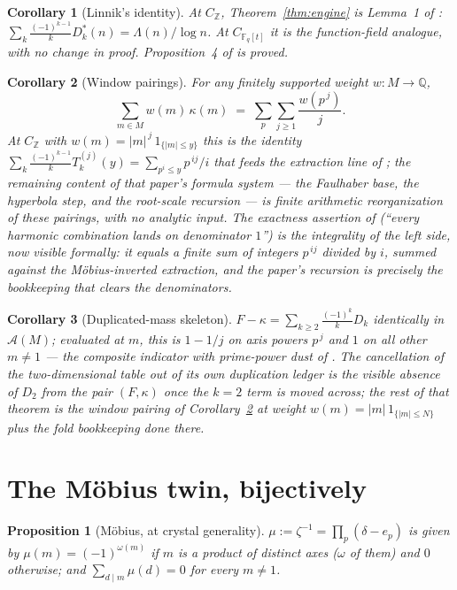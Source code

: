 \documentclass[11pt]{article}
\newtheorem{proposition}{Proposition}
\newtheorem{corollary}{Corollary}
\theoremstyle{remark}
\newcommand{\Q}{\mathbb{Q}}
\newcommand{\Z}{\mathbb{Z}}
\newcommand{\A}{\mathcal{A}}
\begin{document}
\begin{corollary}[Linnik's identity]\label{cor:linnik}
At $C_{\Z}$, Theorem~\ref{thm:engine} is Lemma~1 of \cite{CompanionI}:
$\sum_k \frac{(-1)^{k-1}}{k} D^*_k(n) = \Lambda(n)/\log n$. At $C_{\mathbb{F}_q[t]}$ it is the
function-field analogue, with no change in proof. Proposition~4 of \cite{Defs} is proved.
\end{corollary}

\begin{corollary}[Window pairings]\label{cor:pairing}
For any finitely supported weight $w \colon M \to \Q$,
\[
\sum_{m \in M} w(m)\, \kappa(m) \;=\; \sum_{p} \sum_{j \ge 1} \frac{w(p^{\,j})}{j}.
\]
At $C_\Z$ with $w(m) = |m|^{\,j}\,1_{\{|m| \le y\}}$ this is the identity
$\sum_{k} \frac{(-1)^{k-1}}{k} T_k^{(j)}(y) = \sum_{p^i \le y} p^{\,ij}/i$ that feeds the
extraction line of \cite{CompanionI}; the remaining content of that paper's formula system --- the
Faulhaber base, the hyperbola step, and the root-scale recursion --- is finite arithmetic
reorganization of these pairings, with no analytic input. The exactness assertion of
\cite{CompanionI} (``every harmonic combination lands on denominator $1$'') is the integrality of
the left side, now visible formally: it equals a finite sum of integers $p^{\,ij}$ divided by
$i$, summed against the M\"obius-inverted extraction, and the paper's recursion is precisely the
bookkeeping that clears the denominators.
\end{corollary}

\begin{corollary}[Duplicated-mass skeleton]\label{cor:dup}
$F - \kappa = \sum_{k \ge 2} \frac{(-1)^{k}}{k} D_k$ identically in $\A(M)$; evaluated at $m$,
this is $1 - 1/j$ on axis powers $p^{\,j}$ and $1$ on all other $m \ne 1$ --- the composite
indicator with prime-power dust of \cite[Thm.~2]{CompanionI}. The cancellation of the
two-dimensional table out of its own duplication ledger is the visible absence of $D_2$ from the
pair $(F, \kappa)$ once the $k = 2$ term is moved across; the rest of that theorem is the window
pairing of Corollary~\ref{cor:pairing} at weight $w(m) = |m|\,1_{\{|m| \le N\}}$ plus the fold
bookkeeping done there.
\end{corollary}

\section{The M\"obius twin, bijectively}

\begin{proposition}[M\"obius, at crystal generality]\label{prop:mu}
$\mu := \zeta^{-1} = \prod_p (\delta - e_p)$ is given by $\mu(m) = (-1)^{\omega(m)}$ if $m$ is a
product of distinct axes ($\omega$ of them) and $0$ otherwise; and $\sum_{d \mid m} \mu(d) = 0$
for every $m \ne 1$.
\end{proposition}
\end{document}
